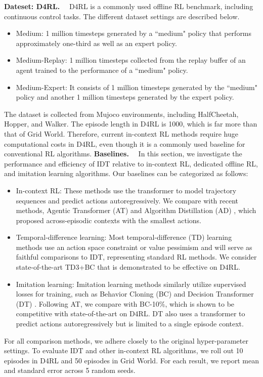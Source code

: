 \documentclass{article}
\theoremstyle{plain}
\theoremstyle{definition}
\theoremstyle{remark}
\begin{document}
\noindent\textbf{Dateset: D4RL.}~~
D4RL \cite{13} is a commonly used offline RL benchmark, including continuous control tasks. The different dataset settings are described below.
\begin{itemize}
    \item Medium: 1 million timesteps generated by a ``medium" policy that performs approximately one-third as well as an expert policy.
    \item Medium-Replay: 1 million timesteps collected from the replay buffer of an agent trained to the performance of a ``medium" policy.
    \item Medium-Expert: It consists of 1 million timesteps generated by the ``medium" policy and another 1 million timesteps generated by the expert policy.
\end{itemize}
The dataset is collected from Mujoco environments, including HalfCheetah, Hopper, and Walker. The episode length in D4RL is 1000, which is far more than that of Grid World. Therefore, current in-context RL methods require huge computational costs in D4RL, even though it is a commonly used baseline for conventional RL algorithms.
\noindent\textbf{Baselines.}~~
In this section, we investigate the performance and efficiency of IDT relative to in-context RL, dedicated offline RL, and imitation learning algorithms. Our baselines can be categorized as follows:
\begin{itemize}
    \item In-context RL: These methods use the transformer to model trajectory sequences and predict actions autoregressively. We compare with recent methods, Agentic Transformer (AT) \cite{1} and Algorithm Distillation (AD) \cite{8}, which proposed across-episodic contexts with the smallest actions.
    \vspace{-2pt}
    \item Temporal-difference learning: Most temporal-difference (TD) learning methods use an action space constraint or value pessimism and will serve as faithful comparisons to IDT, representing standard RL methods. We consider state-of-the-art TD3+BC \cite{29} that is demonstrated to be effective on D4RL.
    \vspace{-2pt}
    \item Imitation learning: Imitation learning methods similarly utilize supervised losses for training, such as Behavior Cloning (BC) \cite{30} and Decision Transformer (DT) \cite{2}. Following AT, we compare with BC-10$\%$, which is shown to be competitive with state-of-the-art on D4RL. DT also uses a transformer to predict actions autoregressively but is limited to a single episode context.
\end{itemize}
For all comparison methods, we adhere closely to the original hyper-parameter settings. To evaluate IDT and other in-context RL algorithms, we roll out 10 episodes in D4RL and 50 episodes in Grid World. For each result, we report mean and standard error across 5 random seeds.
\end{document}
